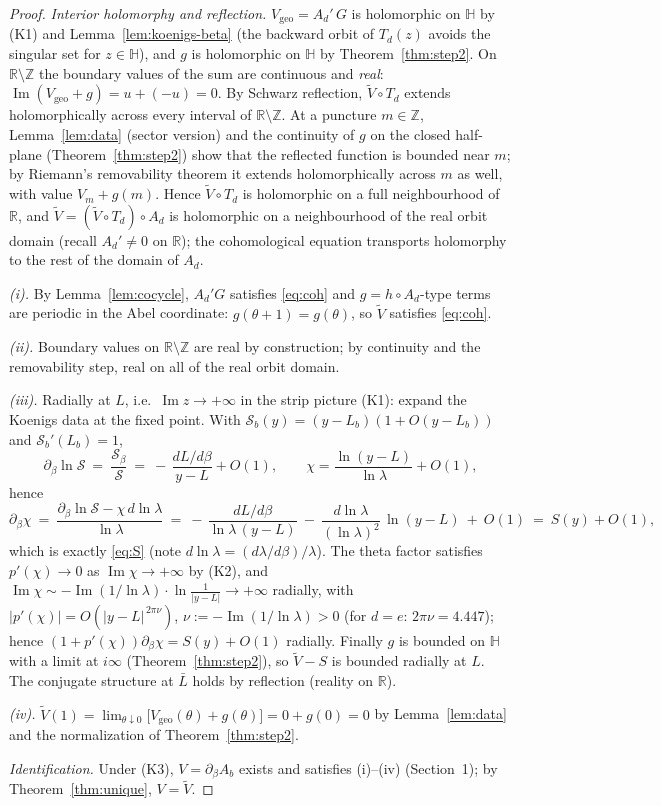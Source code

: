 \documentclass[11pt]{article}
\newcommand{\R}{\mathbb{R}}
\newcommand{\Z}{\mathbb{Z}}
\newcommand{\Hup}{\mathbb{H}}
\newcommand{\Sk}{\mathcal S}
\begin{document}
\begin{proof}
\emph{Interior holomorphy and reflection.}
$V_{\mathrm{geo}}=A_d'\,G$ is holomorphic on $\Hup$ by (K1) and
Lemma~\ref{lem:koenigs-beta} (the backward orbit of $T_d(z)$ avoids the
singular set for $z\in\Hup$), and $g$ is holomorphic on $\Hup$ by
Theorem~\ref{thm:step2}.  On $\R\setminus\Z$ the boundary values of the
sum are continuous and \emph{real}:
$\operatorname{Im}(V_{\mathrm{geo}}+g)=u+(-u)=0$.  By Schwarz reflection,
$\widetilde V\circ T_d$ extends holomorphically across every interval of
$\R\setminus\Z$.  At a puncture $m\in\Z$, Lemma~\ref{lem:data} (sector
version) and the continuity of $g$ on the closed half-plane
(Theorem~\ref{thm:step2}) show that the reflected function is bounded
near $m$; by Riemann's removability theorem it extends holomorphically
across $m$ as well, with value $V_m+g(m)$.  Hence
$\widetilde V\circ T_d$ is holomorphic on a full neighbourhood of $\R$,
and $\widetilde V=(\widetilde V\circ T_d)\circ A_d$ is holomorphic on a
neighbourhood of the real orbit domain (recall $A_d'\neq0$ on $\R$); the
cohomological equation transports holomorphy to the rest of the domain of
$A_d$.

\emph{(i).}  By Lemma~\ref{lem:cocycle}, $A_d'G$ satisfies \eqref{eq:coh}
and $g=h\circ A_d$-type terms are periodic in the Abel coordinate:
$g(\theta+1)=g(\theta)$, so $\widetilde V$ satisfies \eqref{eq:coh}.

\emph{(ii).}  Boundary values on $\R\setminus\Z$ are real by
construction; by continuity and the removability step, real on all of the
real orbit domain.

\emph{(iii).}  Radially at $L$, i.e.\ $\operatorname{Im}z\to+\infty$ in
the strip picture (K1): expand the Koenigs data at the fixed point.
With $\Sk_b(y)=(y-L_b)(1+O(y-L_b))$ and $\Sk_b'(L_b)=1$,
\[
  \partial_\beta\ln\Sk\ =\ \frac{\Sk_\beta}{\Sk}
  \ =\ -\,\frac{dL/d\beta}{y-L}+O(1),
  \qquad
  \chi=\frac{\ln(y-L)}{\ln\lambda}+O(1),
\]
hence
\[
  \partial_\beta\chi
  \ =\ \frac{\partial_\beta\ln\Sk-\chi\,d\ln\lambda}{\ln\lambda}
  \ =\ -\,\frac{dL/d\beta}{\ln\lambda\,(y-L)}
  \ -\ \frac{d\ln\lambda}{(\ln\lambda)^2}\,\ln(y-L)\ +\ O(1)
  \ =\ S(y)+O(1),
\]
which is exactly \eqref{eq:S} (note $d\ln\lambda=(d\lambda/d\beta)/
\lambda$).  The theta factor satisfies $p'(\chi)\to0$ as
$\operatorname{Im}\chi\to+\infty$ by (K2), and
$\operatorname{Im}\chi\sim-\operatorname{Im}(1/\ln\lambda)\cdot
\ln\!\frac1{|y-L|}\to+\infty$ radially, with
$|p'(\chi)|=O(|y-L|^{\,2\pi\nu})$, $\nu:=-\operatorname{Im}(1/\ln\lambda)
>0$ (for $d=e$: $2\pi\nu=4.447$); hence
$(1+p'(\chi))\partial_\beta\chi=S(y)+O(1)$ radially.  Finally $g$ is
bounded on $\Hup$ with a limit at $i\infty$
(Theorem~\ref{thm:step2}), so $\widetilde V-S$ is bounded radially at
$L$.  The conjugate structure at $\bar L$ holds by reflection (reality on
$\R$).

\emph{(iv).}  $\widetilde V(1)=\lim_{\theta\downarrow0}
\bigl[V_{\mathrm{geo}}(\theta)+g(\theta)\bigr]=0+g(0)=0$ by
Lemma~\ref{lem:data} and the normalization of Theorem~\ref{thm:step2}.

\emph{Identification.}  Under (K3), $V=\partial_\beta A_b$ exists and
satisfies (i)--(iv) (Section~1); by Theorem~\ref{thm:unique},
$V=\widetilde V$.
\end{proof}
\end{document}

